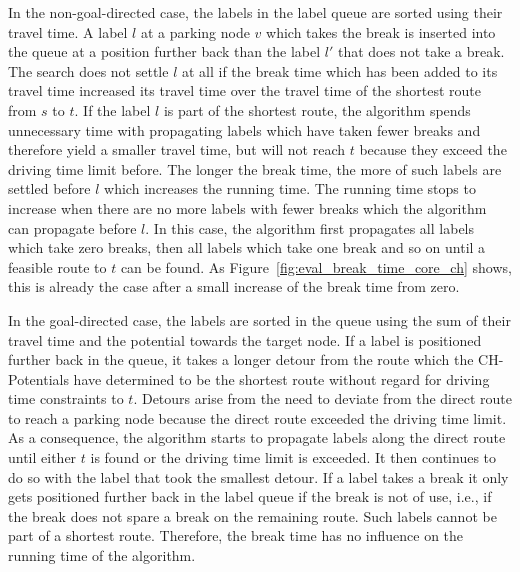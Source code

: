 In the non-goal-directed case, the labels in the label queue are sorted using their travel time. A label $l$ at a parking node $v$ which takes the break is inserted into the queue at a position further back than the label $l'$ that does not take a break. The search does not settle $l$ at all if the break time which has been added to its travel time increased its travel time over the travel time of the shortest route from $s$ to $t$. If the label $l$ is part of the shortest route, the algorithm spends unnecessary time with propagating labels which have taken fewer breaks and therefore yield a smaller travel time, but will not reach $t$ because they exceed the driving time limit before. The longer the break time, the more of such labels are settled before $l$ which increases the running time. The running time stops to increase when there are no more labels with fewer breaks which the algorithm can propagate before $l$. In this case, the algorithm first propagates all labels which take zero breaks, then all labels which take one break and so on until a feasible route to $t$ can be found. As Figure~\ref{fig:eval_break_time_core_ch} shows, this is already the case after a small increase of the break time from zero.

In the goal-directed case, the labels are sorted in the queue using the sum of their travel time and the potential towards the target node. If a label is positioned further back in the queue, it takes a longer detour from the route which the CH-Potentials have determined to be the shortest route without regard for driving time constraints to $t$. Detours arise from the need to deviate from the direct route to reach a parking node because the direct route exceeded the driving time limit. As a consequence, the algorithm starts to propagate labels along the direct route until either $t$ is found or the driving time limit is exceeded. It then continues to do so with the label that took the smallest detour. If a label takes a break it only gets positioned further back in the label queue if the break is not of use, i.e., if the break does not spare a break on the remaining route. Such labels cannot be part of a shortest route. Therefore, the break time has no influence on the running time of the algorithm.


